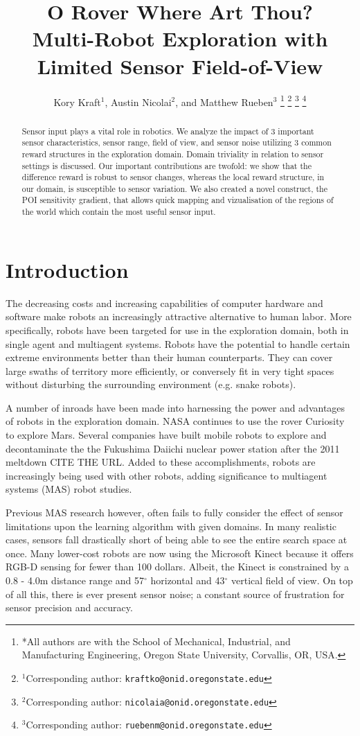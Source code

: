 \documentclass[letterpaper, 10 pt, conference]{ieeeconf}  %
\title{\LARGE \bf 
O Rover Where Art Thou?\\
Multi-Robot Exploration with Limited Sensor Field-of-View
}
\author{Kory Kraft$^{1}$, Austin Nicolai$^{2}$, and Matthew Rueben$^{3}$%
\thanks{*All authors are with the School of Mechanical, Industrial, and Manufacturing Engineering,
         Oregon State University,
         Corvallis, OR, USA. }%
\thanks{$^{1}$Corresponding author: {\tt\small kraftko@onid.oregonstate.edu}}%
\thanks{$^{2}$Corresponding author: {\tt\small nicolaia@onid.oregonstate.edu}}%
\thanks{$^{3}$Corresponding author: {\tt\small ruebenm@onid.oregonstate.edu}}%
}
\begin{document}
\maketitle
\thispagestyle{empty}
\pagestyle{empty}

\begin{abstract}
Sensor input plays a vital role in robotics.
We analyze the impact of 3 important sensor characteristics, sensor range,
field of view, and sensor noise utilizing 3 common reward structures in the 
exploration domain. Domain triviality in relation to sensor settings is discussed.
Our important contributions are twofold: we show that the 
difference reward is robust to sensor changes, whereas 
the local reward structure, in our domain, is susceptible to sensor variation.
We also created a novel construct, the POI sensitivity gradient, that allows
quick mapping and vizualisation of the regions of the world which
contain the most useful sensor input.  
\end{abstract}


\section{Introduction}
The decreasing costs and increasing capabilities of computer hardware and software make
robots an increasingly attractive alternative to human labor. More specifically, robots have 
been targeted for use in the exploration domain, both in single agent and 
multiagent systems.  Robots have the potential to
handle certain extreme environments better than their human
counterparts.  They can cover large swaths of territory more
efficiently, or conversely fit in very tight spaces without disturbing
the surrounding environment (e.g. snake robots). 

A number of inroads have been made into harnessing the power and
advantages of robots in the exploration domain. NASA continues to use
the rover Curiosity to explore Mars. Several companies have built
mobile robots to explore and decontaminate the the Fukushima Daiichi
nuclear power station after the 2011 meltdown CITE THE URL. Added to these
accomplishments, robots are increasingly being used with other robots, 
adding significance to multiagent systems (MAS) robot studies.

Previous MAS research however, often fails to fully consider the effect of
sensor limitations upon the learning algorithm with given domains. In many realistic cases, sensors fall drastically short of being able to see the entire search space at once. Many lower-cost robots are now using the Microsoft Kinect because it offers RGB-D sensing for fewer than 100 dollars. Albeit, the Kinect is constrained by a 0.8 - 4.0m distance range and 57$^{\circ}$ horizontal and 43$^{\circ}$ vertical field of view. On top of all this, there is ever present sensor noise; a constant source of frustration for sensor precision and accuracy.
\end{document}
